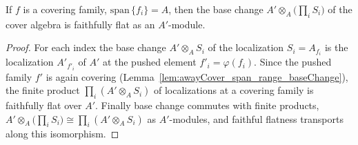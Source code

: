 \begin{lemma}
  \label{lem:awayCover_faithfullyFlat_tensor}
  \leanok
  If \(f\) is a covering family, \(\mathrm{span}\,\{f_i\} = A\), then the base change \(A'
  \otimes_A \bigl(\prod_i S_i\bigr)\) of the cover algebra is faithfully flat as an
  \(A'\)-module.
\end{lemma}
\begin{proof}
  \leanok
  For each index the base change \(A' \otimes_A S_i\) of the localization \(S_i = A_{f_i}\) is
  the localization \(A'_{f'_i}\) of \(A'\) at the pushed element \(f'_i = \varphi(f_i)\).  Since
  the pushed family \(f'\) is again covering
  (Lemma~\ref{lem:awayCover_span_range_baseChange}), the finite product \(\prod_i (A' \otimes_A
  S_i)\) of localizations at a covering family is faithfully flat over \(A'\).  Finally base
  change commutes with finite products, \(A' \otimes_A \bigl(\prod_i S_i\bigr) \cong \prod_i (A'
  \otimes_A S_i)\) as \(A'\)-modules, and faithful flatness transports along this isomorphism.
\end{proof}

